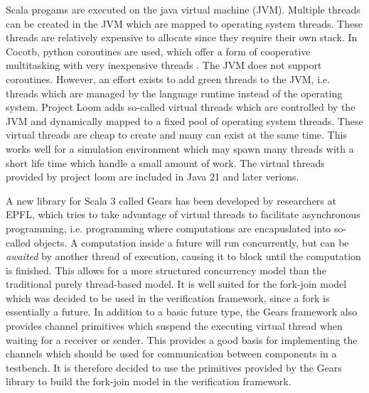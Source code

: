 Scala progams are executed on the java virtual machine (JVM). Multiple threads can be created in the JVM which are
mapped to operating system threads. These threads are relatively expensive to allocate since they require their own
stack. In Cocotb, python coroutines are used, which offer a form of cooperative multitasking with very inexpensive
threads \cite{pycoroutines}. The JVM does not support coroutines. However, an effort exists to add green threads to
the JVM, i.e. threads which are managed by the language runtime instead of the operating system. Project Loom
\cite{loom} adds so-called virtual threads which are controlled by the JVM and dynamically mapped to a fixed pool of
operating system threads. These virtual threads are cheap to create and many can exist at the same time. This works
well for a simulation environment which may spawn many threads with a short life time which handle a small amount of
work. The virtual threads provided by project loom are included in Java 21 and later verions.

A new library for Scala 3 called Gears \cite{gears} has been developed by researchers at EPFL, which tries to take
advantage of virtual threads to facilitate asynchronous programming, i.e. programming where computations are
encapuslated into so-called  objects. A computation inside a future will run concurrently, but can be
\textit{awaited} by another thread of execution, causing it to block until the computation is finished. This allows
for a more structured concurrency model than the traditional purely thread-based model. It is well suited for the
fork-join model which was decided to be used in the verification framework, since a fork is essentially a future. In
addition to a basic future type, the Gears framework also provides channel primitives which suspend the executing
virtual thread when waiting for a receiver or sender. This provides a good basis for implementing the channels which
should be used for communication between components in a testbench. It is therefore decided to use the primitives
provided by the Gears library to build the fork-join model in the verification framework.

